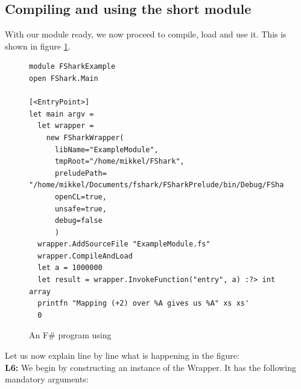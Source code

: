 \subsection{Compiling and using the short \fshark{} module}
\label{compilingandusingfsharkmodule}
With our \fshark{} module ready, we now proceed to compile, load and use it.
This is shown in figure \ref{fig:fsharkusageexample}.
\begin{figure}[H]
  \centering
    \begin{verbatim}
module FSharkExample
open FShark.Main

[<EntryPoint>]
let main argv =
  let wrapper = 
    new FSharkWrapper(
      libName="ExampleModule",
      tmpRoot="/home/mikkel/FShark",
      preludePath= "/home/mikkel/Documents/fshark/FSharkPrelude/bin/Debug/FSharkPrelude.dll",
      openCL=true,
      unsafe=true,
      debug=false
      )
  wrapper.AddSourceFile "ExampleModule.fs"
  wrapper.CompileAndLoad
  let a = 1000000
  let result = wrapper.InvokeFunction("entry", a) :?> int array
  printfn "Mapping (+2) over %A gives us %A" xs xs'
  0
    \end{verbatim}
  \caption{An F\# program using \fshark{}}
  \label{fig:fsharkusageexample}
\end{figure}

Let us now explain line by line what is happening in the figure:\\
\textbf{L6:} We begin by constructing an instance of the \fshark{}Wrapper. It has the following
mandatory arguments:

